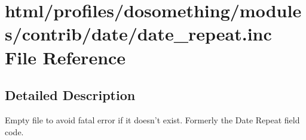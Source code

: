 \hypertarget{date__repeat_8inc}{
\section{html/profiles/dosomething/modules/contrib/date/date\_\-repeat.inc File Reference}
\label{date__repeat_8inc}
}


\subsection{Detailed Description}
Empty file to avoid fatal error if it doesn't exist. Formerly the Date Repeat field code. 